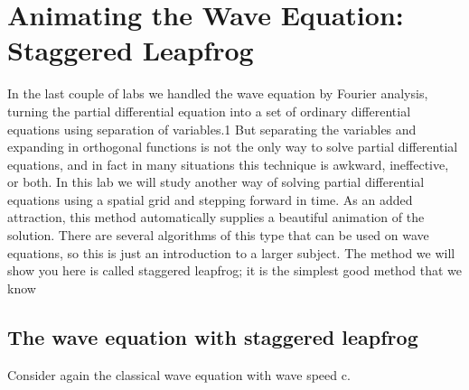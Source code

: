 
\chapter*{Animating the Wave Equation: Staggered Leapfrog}
In the last couple of labs we handled the wave equation by Fourier analysis,
turning the partial differential equation into a set of ordinary differential equations using separation of variables.1 But separating the variables and expanding
in orthogonal functions is not the only way to solve partial differential equations,
and in fact in many situations this technique is awkward, ineffective, or both. In
this lab we will study another way of solving partial differential equations using a
spatial grid and stepping forward in time. As an added attraction, this method
automatically supplies a beautiful animation of the solution. There are several
algorithms of this type that can be used on wave equations, so this is just an
introduction to a larger subject. The method we will show you here is called
staggered leapfrog; it is the simplest good method that we know


\section*{The wave equation with staggered leapfrog}
Consider again the classical wave equation with wave speed c.

